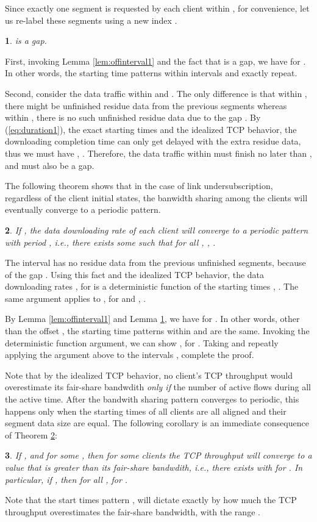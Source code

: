 \documentclass[conference]{IEEEtran}
\theoremstyle{plain}
\newtheorem{thm}{\protect\theoremname}
\theoremstyle{definition}
\theoremstyle{plain}
\newtheorem{lem}[thm]{\protect\lemmaname}
\theoremstyle{plain}
\newtheorem{cor}[thm]{\protect\corollaryname}
\providecommand{\corollaryname}{Corollary}
\providecommand{\lemmaname}{Lemma}
\providecommand{\theoremname}{Theorem}
\begin{document}
Since exactly one segment is requested by each client within ,
for convenience, let us re-label these segments using a new index
.
\begin{lem}
\label{lem:offinterval12} is a gap.\end{lem}
\begin{IEEEproof}
First, invoking Lemma \ref{lem:offinterval1} and the fact that 
is a gap, we have  for .
In other words, the starting time patterns within intervals 
and  exactly repeat.

Second, consider the data traffic within  and
. The only difference is that within ,
there might be unfinished residue data from the previous segments
whereas within , there is no such unfinished
residue data due to the gap . By (\ref{eq:duration1}),
the exact starting times and the idealized TCP behavior, the downloading
completion time can only get delayed with the extra residue data,
thus we must have ,
. Therefore, the data traffic within 
must finish no later than , and 
must also be a gap.
\end{IEEEproof}
The following theorem shows that in the case of link undersubscription,
regardless of the client initial states, the banwidth sharing among
the clients will eventually converge to a periodic pattern.
\begin{thm}
\label{thm:undersubscribed1}If , the data
downloading rate  of each client will converge to a periodic
pattern with period , i.e., there exists some  such
that for all , , .\end{thm}
\begin{IEEEproof}
The interval  has no residue data from the previous
unfinished segments, because of the gap . Using this
fact and the idealized TCP behavior, the data downloading rates ,
 for  is a deterministic function
of the starting times , . The same argument
applies to ,  for 
and , . 

By Lemma \ref{lem:offinterval1} and Lemma \ref{lem:offinterval12},
we have  for . In other words,
other than the offset , the starting time patterns within 
and  are the same. Invoking the deterministic
function argument, we can show , 
for . Taking  and repeatly applying
the argument above to the intervals ,
 complete the proof.
\end{IEEEproof}
Note that by the idealized TCP behavior, no client's TCP throughput
would overestimate its fair-share bandwdith  \emph{only
if} the number of active flows  during all the active time.
After the bandwith sharing pattern converges to periodic, this happens
only when the starting times of all clients are all aligned and their
segment data size are equal. The following corollary is an immediate
consequence of Theorem \ref{thm:undersubscribed1}:
\begin{cor}
If , and  for some
, then for some clients the TCP throughput will converge
to a value that is greater than its fair-share bandwdith, i.e., there
exists  with  for .
In particular, if , then for all ,
 for .
\end{cor}
Note that the start times pattern ,  will
dictate exactly by how much the TCP throughput overestimates the fair-share
bandwidth, with the range .
\end{document}
